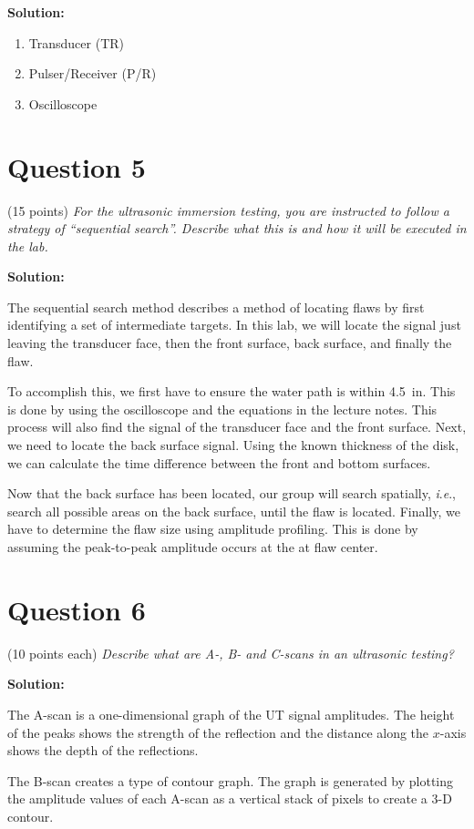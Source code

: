 \documentclass[12 pt]{article}
\newcommand{\ie}{\textit{i}.\textit{e}., }
\begin{document}
\textbf{Solution:}

\begin{enumerate}
	\item Transducer (TR)
	\item Pulser/Receiver (P/R)
	\item Oscilloscope
\end{enumerate}

\section*{Question 5}
(\num{15} points) \textit{For the ultrasonic immersion testing, you are instructed to follow a strategy of ``sequential search''. Describe what this is and how it will be executed in the lab.}

\textbf{Solution:}

The sequential search method describes a method of locating flaws by first identifying a set of intermediate targets. In this lab, we will locate the signal just leaving the transducer face, then the front surface, back surface, and finally the flaw.

To accomplish this, we first have to ensure the water path is within \qty{4.5}{in}. This is done by using the oscilloscope and the equations in the lecture notes. This process will also find the signal of the transducer face and the front surface. Next, we need to locate the back surface signal. Using the known thickness of the disk, we can calculate the time difference between the front and bottom surfaces.

Now that the back surface has been located, our group will search spatially, \ie search all possible areas on the back surface, until the flaw is located. Finally, we have to determine the flaw size using amplitude profiling. This is done by assuming the peak-to-peak amplitude occurs at the at flaw center.

\section*{Question 6}
(\num{10} points each) \textit{Describe what are A-, B- and C-scans in an ultrasonic testing?}

\textbf{Solution:}

The A-scan is a one-dimensional graph of the UT signal amplitudes. The height of the peaks shows the strength of the reflection and the distance along the $x$-axis shows the depth of the reflections.

The B-scan creates a type of contour graph. The graph is generated by plotting the amplitude values of each A-scan as a vertical stack of pixels to create a 3-D contour.
\end{document}
